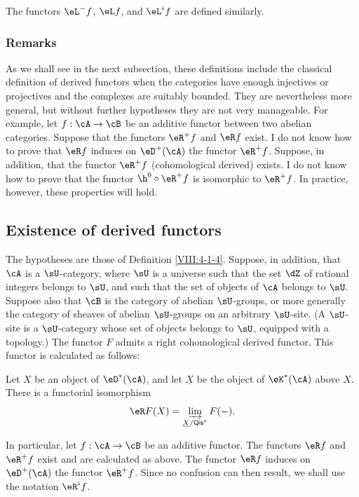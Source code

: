 \documentclass[oneside]{book}
\begin{document}
The functors $\eL^- f$, $\eL f$, and $\eL^i f$ are defined similarly.

\subsubsection{Remarks}\label{VIII:4-1-6}

As we shall see in the next subsection, these definitions include the
classical definition of derived functors when the categories have enough
injectives or projectives and the complexes are suitably bounded. They are
nevertheless more general, but without further hypotheses they are not
very manageable. For example, let $f:\cA\to \cB$ be an additive functor
between two abelian categories. Suppose that the functors $\eR^+ f$ and
$\eR f$ exist. I do not know how to prove that $\eR f$ induces on
$\eD^+(\cA)$ the functor $\eR^+ f$. Suppose, in addition, that the functor
$\eR^+ f$ (cohomological derived) exists. I do not know how to prove that
the functor $\h^0{}\circ \eR^+ f$ is isomorphic to $\eR^+ f$. In practice,
however, these properties will hold.

\subsection{Existence of derived functors}\label{VIII:4-2}

\begin{proposition}\label{VIII:4-2-1}
The hypotheses are those of Definition \ref{VIII:4-1-4}. Suppose, in
addition, that $\cA$ is a $\sU$-category, where $\sU$ is a universe such
that the set $\dZ$ of rational integers belongs to $\sU$, and such that
the set of objects of $\cA$ belongs to $\sU$. Suppose also that $\cB$ is
the category of abelian $\sU$-groups, or more generally the category of
sheaves of abelian $\sU$-groups on an arbitrary $\sU$-site. (A $\sU$-site
is a $\sU$-category whose set of objects belongs to $\sU$, equipped with
a topology.) The functor $F$ admits a right cohomological derived functor.
This functor is calculated as follows:

Let $X$ be an object of $\eD^\ast(\cA)$, and let $\underline X$ be the
object of $\eK^\ast(\cA)$ above $X$. There is a functorial isomorphism
\[
  \eR F(X) = \varinjlim_{\underline X/\mathsf{Qis}^\ast} F(-) \text{.}
\]
\end{proposition}

In particular, let $f:\cA\to \cB$ be an additive functor. The functors
$\eR f$ and $\eR^+ f$ exist and are calculated as above. The functor
$\eR f$ induces on $\eD^+(\cA)$ the functor $\eR^+ f$. Since no confusion
can then result, we shall use the notation $\eR^i f$.
\end{document}
